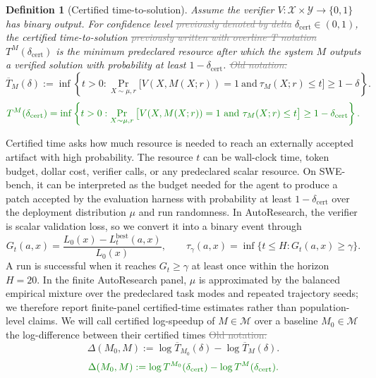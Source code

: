 \documentclass{article}
\newcommand{\oldtext}[1]{\textcolor{gray}{\sout{#1}}}
\newcommand{\newtext}[1]{\textcolor{green!50!black}{#1}}
\newtheorem{definition}{Definition}
\newcommand{\cM}{\mathcal{M}}
\begin{document}
\begin{definition}[Certified time-to-solution]
\label{def:certified-time}
Assume the verifier $V \colon \mathcal{X} \times \mathcal{Y} \to \{0,1\}$ has binary output.
For confidence level \oldtext{previously denoted by delta} \newtext{\(\delta_{\mathrm{cert}}\in(0,1)\)}, the certified time-to-solution \oldtext{previously written with overline T notation} \newtext{\(T^M(\delta_{\mathrm{cert}})\)} is the minimum predeclared resource after which the system \(M\) outputs a verified solution with probability at least \(1-\delta_{\mathrm{cert}}\).
\oldtext{Old notation:}
\[
    \overline T_M(\delta)
    :=
    \inf\left\{
        t>0:
        \Pr_{X\sim\mu,r}
        \big[
            V(X,M(X;r))=1
            \ \mathrm{and}\
            \tau_M(X;r)\le t
        \big]
        \ge 1-\delta
    \right\}.
\]
\[
    {\color{green!50!black}
    T^M(\delta_{\mathrm{cert}})
    =
    \inf\left\{
        t>0:
        \Pr_{X\sim\mu,r}
        \big[
            V(X,M(X;r))=1
            \ \mathrm{and}\
            \tau_M(X;r)\le t
        \big]
        \ge 1-\delta_{\mathrm{cert}}
    \right\}.}
\]
\end{definition}
Certified time asks how much resource is needed to reach an externally accepted artifact with high probability.
{\color{green!50!black}
The resource \(t\) can be wall-clock time, token budget, dollar cost, verifier calls, or any predeclared scalar resource.
On SWE-bench, it can be interpreted as the budget needed for the agent to produce a patch accepted by the evaluation harness with probability at least \(1-\delta_{\mathrm{cert}}\) over the deployment distribution \(\mu\) and run randomness.
In AutoResearch, the verifier is scalar validation loss, so we convert it into a binary event through
\[
G_t(a,x)=\frac{L_0(x)-L_t^{\mathrm{best}}(a,x)}{L_0(x)},
\qquad
\tau_\gamma(a,x)=\inf\{t\le H:G_t(a,x)\ge\gamma\}.
\]
A run is successful when it reaches \(G_t\ge\gamma\) at least once within the horizon \(H=20\).
In the finite AutoResearch panel, \(\mu\) is approximated by the balanced empirical mixture over the predeclared task modes and repeated trajectory seeds; we therefore report finite-panel certified-time estimates rather than population-level claims.
}
We will call certified log-speedup of \(M \in \cM \) over a baseline \(M_0 \in \cM\) the log-difference between their certified times
\oldtext{Old notation:}
\[
    \Delta(M_0,M)
    :=
    \log \overline T_{M_0}(\delta)
    -
    \log \overline T_M(\delta).
\]
\[
    {\color{green!50!black}
    \Delta(M_0,M)
    :=
    \log T^{M_0}(\delta_{\mathrm{cert}})
    -
    \log T^M(\delta_{\mathrm{cert}}).}
\]
\end{document}
